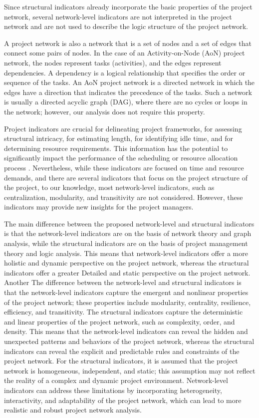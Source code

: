 \documentclass[preprint,
3p]{elsarticle} %
\begin{document}
Since structural indicators already incorporate the basic properties of
the project network, several network-level indicators are not
interpreted in the project network and are not used to describe the
logic structure of the project network.

A project network is also a network that is a set of nodes and a set of
edges that connect some pairs of nodes. In the case of an
Activity-on-Node (AoN) project network, the nodes represent tasks
(activities), and the edges represent dependencies. A dependency is a
logical relationship that specifies the order or sequence of the tasks.
An AoN project network is a directed network in which the edges have a
direction that indicates the precedence of the tasks. Such a network is
usually a directed acyclic graph (DAG), where there are no cycles or
loops in the network; however, our analysis does not require this
property.

Project indicators are crucial for delineating project frameworks, for
assessing structural intricacy, for estimating length, for identifying
idle time, and for determining resource requirements. This information
has the potential to significantly impact the performance of the
scheduling or resource allocation process \citep{van2023summary}.
Nevertheless, while these indicators are focused on time and resource
demands, and there are several indicators that focus on the project
structure of the project, to our knowledge, most network-level
indicators, such as centralization, modularity, and transitivity are not
considered. However, these indicators may provide new insights for the
project managers.

The main difference between the proposed network-level and structural
indicators is that the network-level indicators are on the basis of
network theory and graph analysis, while the structural indicators are
on the basis of project management theory and logic analysis. This means
that network-level indicators offer a more holistic and dynamic
perspective on the project network, whereas the structural indicators
offer a greater Detailed and static perspective on the project network.
Another The difference between the network-level and structural
indicators is that the network-level indicators capture the emergent and
nonlinear properties of the project network; these properties include
modularity, centrality, resilience, efficiency, and transitivity. The
structural indicators capture the deterministic and linear properties of
the project network, such as complexity, order, and density. This means
that the network-level indicators can reveal the hidden and unexpected
patterns and behaviors of the project network, whereas the structural
indicators can reveal the explicit and predictable rules and constraints
of the project network. For the structural indicators, it is assumed
that the project network is homogeneous, independent, and static; this
assumption may not reflect the reality of a complex and dynamic project
environment. Network-level indicators can address these limitations by
incorporating heterogeneity, interactivity, and adaptability of the
project network, which can lead to more realistic and robust project
network analysis.
\end{document}
